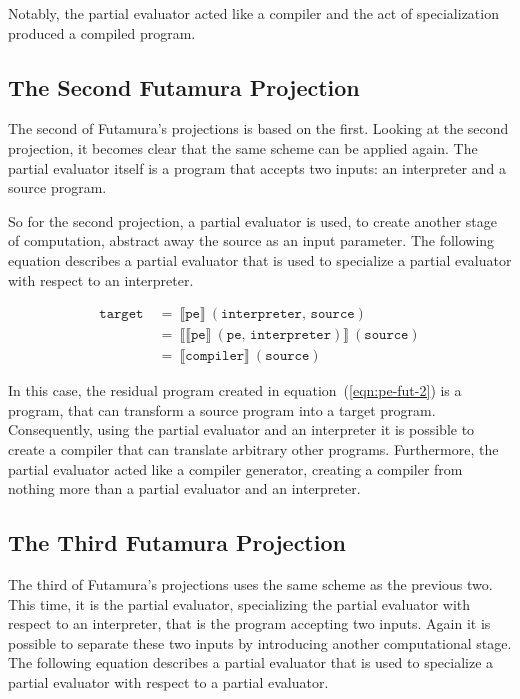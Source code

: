 Notably, the partial evaluator acted like a compiler and the act of specialization produced a compiled program.


\subsection{The Second Futamura Projection}\label{sec:futamura-second}

The second of Futamura's projections is based on the first.
Looking at the second projection, it becomes clear that the same scheme can be applied again.
The partial evaluator itself is a program that accepts two inputs: an interpreter and a source program.

So for the second projection, a partial evaluator is used, to create another stage of computation, abstract away the source as an input parameter.
The following equation describes a partial evaluator that is used to specialize a partial evaluator with respect to an interpreter.

\begin{align}
  \mathtt{target}\
  &=\ \llbracket \mathtt{pe} \rrbracket \ (\mathtt{interpreter},\, \mathtt{source}) \\
  &=\ \llbracket \llbracket \mathtt{pe} \rrbracket \ (\mathtt{pe},\, \mathtt{interpreter}) \rrbracket \ (\mathtt{source}) \label{eqn:pe-fut-2}\\
  &=\ \llbracket \mathtt{compiler} \rrbracket \ (\mathtt{source})
\end{align}

In this case, the residual program created in equation~(\ref{eqn:pe-fut-2}) is a program, that can transform a source program into a target program.
Consequently, using the partial evaluator and an interpreter it is possible to create a compiler that can translate arbitrary other programs.
Furthermore, the partial evaluator acted like a compiler generator, creating a compiler from nothing more than a partial evaluator and an interpreter.


\subsection{The Third Futamura Projection}\label{sec:futamura-thrid}

The third of Futamura's projections uses the same scheme as the previous two.
This time, it is the partial evaluator, specializing the partial evaluator with respect to an interpreter, that is the program accepting two inputs.
Again it is possible to separate these two inputs by introducing another computational stage.
The following equation describes a partial evaluator that is used to specialize a partial evaluator with respect to a partial evaluator.

